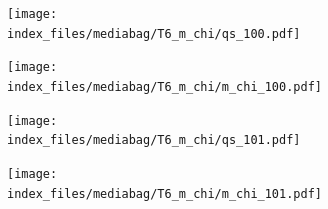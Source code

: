 \documentclass[
  11pt,
  letterpaper,
]{scrreprt}
\begin{document}
\begin{figure}

\begin{minipage}{0.50\linewidth}

\begin{figure}[H]

{\centering \texttt{[image: index\_files/mediabag/T6\_m\_chi/qs\_100.pdf]}

}


\end{figure}%

\end{minipage}%
%
\begin{minipage}{0.50\linewidth}

\begin{figure}[H]

{\centering \texttt{[image: index\_files/mediabag/T6\_m\_chi/m\_chi\_100.pdf]}

}


\end{figure}%

\end{minipage}%

\end{figure}%

\begin{figure}

\begin{minipage}{0.50\linewidth}

\begin{figure}[H]

{\centering \texttt{[image: index\_files/mediabag/T6\_m\_chi/qs\_101.pdf]}

}


\end{figure}%

\end{minipage}%
%
\begin{minipage}{0.50\linewidth}

\begin{figure}[H]

{\centering \texttt{[image: index\_files/mediabag/T6\_m\_chi/m\_chi\_101.pdf]}

}


\end{figure}%

\end{minipage}%

\end{figure}%
\end{document}
